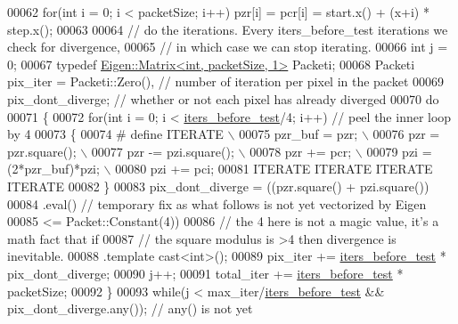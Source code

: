 \begin{DoxyCode}
00062       \textcolor{keywordflow}{for}(\textcolor{keywordtype}{int} i = 0; i < packetSize; i++) pzr[i] = pcr[i] = start.x() + (x+i) * step.x();
00063 
00064       \textcolor{comment}{// do the iterations. Every iters\_before\_test iterations we check for divergence,}
00065       \textcolor{comment}{// in which case we can stop iterating.}
00066       \textcolor{keywordtype}{int} j = 0;
00067       \textcolor{keyword}{typedef} \hyperlink{group___core___module_class_eigen_1_1_matrix}{Eigen::Matrix<int, packetSize, 1>} Packeti;
00068       Packeti pix\_iter = Packeti::Zero(), \textcolor{comment}{// number of iteration per pixel in the packet}
00069               pix\_dont\_diverge; \textcolor{comment}{// whether or not each pixel has already diverged}
00070       \textcolor{keywordflow}{do}
00071       \{
00072         \textcolor{keywordflow}{for}(\textcolor{keywordtype}{int} i = 0; i < \hyperlink{structiters__before__test}{iters\_before\_test}/4; i++) \textcolor{comment}{// peel the inner loop by 4}
00073         \{
00074 \textcolor{preprocessor}{#         define ITERATE \(\backslash\)}
00075 \textcolor{preprocessor}{            pzr\_buf = pzr; \(\backslash\)}
00076 \textcolor{preprocessor}{            pzr = pzr.square(); \(\backslash\)}
00077 \textcolor{preprocessor}{            pzr -= pzi.square(); \(\backslash\)}
00078 \textcolor{preprocessor}{            pzr += pcr; \(\backslash\)}
00079 \textcolor{preprocessor}{            pzi = (2*pzr\_buf)*pzi; \(\backslash\)}
00080 \textcolor{preprocessor}{            pzi += pci;}
00081           ITERATE ITERATE ITERATE ITERATE
00082         \}
00083         pix\_dont\_diverge = ((pzr.square() + pzi.square())
00084                            .eval() \textcolor{comment}{// temporary fix as what follows is not yet vectorized by Eigen}
00085                            <= Packet::Constant(4))
00086                                 \textcolor{comment}{// the 4 here is not a magic value, it's a math fact that if}
00087                                 \textcolor{comment}{// the square modulus is >4 then divergence is inevitable.}
00088                            .\textcolor{keyword}{template} cast<int>();
00089         pix\_iter += \hyperlink{structiters__before__test}{iters\_before\_test} * pix\_dont\_diverge;
00090         j++;
00091         total\_iter += \hyperlink{structiters__before__test}{iters\_before\_test} * packetSize;
00092       \}
00093       \textcolor{keywordflow}{while}(j < max\_iter/\hyperlink{structiters__before__test}{iters\_before\_test} && pix\_dont\_diverge.any()); \textcolor{comment}{// any() is not yet
}
\end{DoxyCode}
